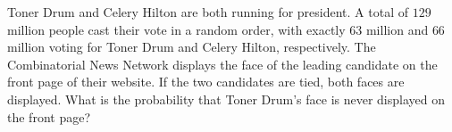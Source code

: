 Toner Drum and Celery Hilton are both running for president. A total of $129$ million people cast their vote in a random order, with exactly $63$ million and $66$ million voting for Toner Drum and Celery Hilton, respectively. The Combinatorial News Network displays the face of the leading candidate on the front page of their website. If the two candidates are tied, both faces are displayed. What is the probability that Toner Drum's face is never displayed on the front page?